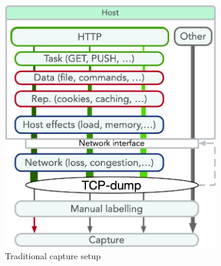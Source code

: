 \documentclass[runningheads]{llncs}
\begin{document}
\begin{figure}
\centering
\begin{subfigure}[b]{0.48\textwidth}
\includegraphics[width=\textwidth]{images/VM_setup_final.png}
\vspace{0.0cm}
\vspace{-0.09cm}
\caption{Traditional capture setup}
\end{subfigure}
\begin{subfigure}[b]{0.48\textwidth}

\end{subfigure}
\end{figure}
\end{document}
